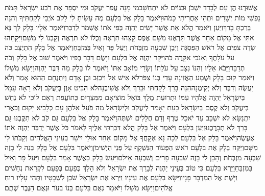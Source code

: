 \documentclass[../main/main.tex]{subfiles}
\begin{document}
\begin{multicols}{\ncols}
אֲשׁוּרֶנּוּ הֶן עָם לְבָדָד יִשְׁכֹּן וּבַגּוֹיִם לֹא יִתְחַשָּׁב\PreVerseSpace{}מִי מָנָה עֲפַר יַעֲקֹב וּמִי יִסְפָּר\SubEnd{} אֶת רֹבַע יִשְׂרָאֵל תָּמֹת נַפְשִׁי מוֹת יְשָׁרִים וּתְהִי אַחֲרִיתִי כָּמֹהוּ\PreVerseSpace{}וַיֹּאמֶר בָּלָק אֶל בִּלְעָם מֶה עָשִׂיתָ לִי לָקֹב אֹיְבַי לְקַחְתִּיךָ וְהִנֵּה בֵּרַכְתָּ בָרֵךְ\PreVerseSpace{}וַיַּעַן וַיֹּאמַר הֲלֹא אֵת אֲשֶׁר יָשִׂים יַהְוֶה בְּפִי אֹתוֹ אֶשְׁמֹר לְדַבֵּר\PreVerseSpace{}וַיֹּאמֶר אֵלָיו בָּלָק לֵךְ נָּא אִתִּי אֶל מָקוֹם אַחֵר אֲשֶׁר תִּרְאֶנּוּ מִשָּׁם אֶפֶס קָצֵהוּ תִרְאֶה וְכֻלּוֹ לֹא תִרְאֶה וְקָבְנוֹ לִי מִשָּׁם\PreVerseSpace{}וַיִּקָּחֵהוּ שְׂדֵה צֹפִים אֶל רֹאשׁ הַפִּסְגָּה וַיִּבֶן שִׁבְעָה מִזְבְּחֹת וַיַּעַל פָּר וָאַיִל בַּמִּזְבֵּחַ\PreVerseSpace{}וַיֹּאמֶר אֶל בָּלָק הִתְיַצֵּב כֹּה עַל עֹלָתֶךָ וְאָנֹכִי אִקָּרֶה כֹּה\PreVerseSpace{}וַיִּקָּר יַהְוֶה אֶל בִּלְעָם וַיָּשֶׂם דָּבָר בְּפִיו וַיֹּאמֶר שׁוּב אֶל בָּלָק וְכֹה תְדַבֵּר\PreVerseSpace{}וַיָּבֹא אֵלָיו וְהִנּוֹ נִצָּב עַל עֹלָתוֹ וְשָׂרֵי מוֹאָב אִתּוֹ וַיֹּאמֶר לוֹ בָּלָק מַה דִּבֶּר יַהְוֶה\PreVerseSpace{}וַיִּשָּׂא מְשָׁלוֹ וַיֹּאמַר קוּם בָּלָק וּשֲׁמָע הַאֲזִינָה עָדַי בְּנוֹ צִפֹּר\PreVerseSpace{}לֹא אִישׁ אֵל וִיכַזֵּב וּבֶן אָדָם וְיִתְנֶחָם הַהוּא אָמַר וְלֹא יַעֲשֶׂה וְדִבֶּר וְלֹא יְקִימֶנָּה\PreVerseSpace{}הִנֵּה בָרֵךְ לָקָחְתִּי וּבֵרֵךְ וְלֹא אֲשִׁיבֶנָּה\PreVerseSpace{}לֹא הִבִּיט אָוֶן בְּיַעֲקֹב וְלֹא רָאָה עָמָל בְּיִשְׂרָאֵל יַהְוֶה אֱלֹהָיו עִמּוֹ וּתְרוּעַת מֶלֶךְ בּוֹ\PreVerseSpace{}אֵל מוֹצִיאָם מִמִּצְרָיִם כְּתוֹעֲפֹת רְאֵם לוֹ\PreVerseSpace{}כִּי לֹא נַחַשׁ בְּיַעֲקֹב וְלֹא קֶסֶם בְּיִשְׂרָאֵל כָּעֵת יֵאָמֵר לְיַעֲקֹב וּלְיִשְׂרָאֵל מַה פֹּעֵל\SubEnd{} אֵל\PreVerseSpace{}הֶן עָם כְּלָבִיא יָקוּם וְכַאֲרִי יִתְנַשָּׂא לֹא יִשְׁכַּב עַד יֹאכַל טֶרֶף וְדַם חֲלָלִים יִשְׁתֶּה\PreVerseSpace{}וַיֹּאמֶר בָּלָק אֶל בִּלְעָם גַּם קֹב לֹא תִקֳּבֶנּוּ גַּם בָּרֵךְ לֹא תְבָרֲכֶנּוּ\PreVerseSpace{}וַיַּעַן בִּלְעָם וַיֹּאמֶר אֶל בָּלָק הֲלֹא דִּבַּרְתִּי אֵלֶיךָ לֵאמֹר כֹּל אֲשֶׁר יְדַבֵּר יַהְוֶה אֹתוֹ אֶעֱשֶׂה\PreVerseSpace{}וַיֹּאמֶר בָּלָק אֶל בִּלְעָם לְכָה נָּא אֶקָּחֲךָ אֶל מָקוֹם אַחֵר אוּלַי יִישַׁר בְּעֵינֵי הָאֱלֹהִים וְקַבֹּתוֹ לִי מִשָּׁם\PreVerseSpace{}וַיִּקַּח בָּלָק אֶת בִּלְעָם רֹאשׁ הַפְּעוֹר הַנִּשְׁקָף עַל פְּנֵי הַיְשִׁימֹן\PreVerseSpace{}וַיֹּאמֶר בִּלְעָם אֶל בָּלָק בְּנֵה לִי בָזֶה שִׁבְעָה מִזְבְּחֹת וְהָכֵן לִי בָּזֶה שִׁבְעָה פָרִים וְשִׁבְעָה אֵילִם\PreVerseSpace{}וַיַּעַשׂ בָּלָק כַּאֲשֶׁר אָמַר בִּלְעָם וַיַּעַל פָּר וָאַיִל בַּמִּזְבֵּחַ\PreChapterSpace{}וַיַּרְא בִּלְעָם כִּי טוֹב בְּעֵינֵי יַהְוֶה לְבָרֵךְ אֶת יִשְׂרָאֵל וְלֹא הָלַךְ כְּפַעַם בְּפַעַם לִקְרַאת נְחָשִׁים וַיָּשֶׁת אֶל הַמִּדְבָּר פָּנָיו\PreVerseSpace{}וַיִּשָּׂא בִלְעָם אֶת עֵינָיו וַיַּרְא אֶת יִשְׂרָאֵל שֹׁכֵן לִשְׁבָטָיו וַתְּהִי עָלָיו רוּחַ אֱלֹהִים\PreVerseSpace{}וַיִּשָּׂא מְשָׁלוֹ וַיֹּאמַר נְאֻם בִּלְעָם בְּנוֹ בְעֹר וּנְאֻם הַגֶּבֶר שְׁתֻם 
\end{multicols}
\end{document}
